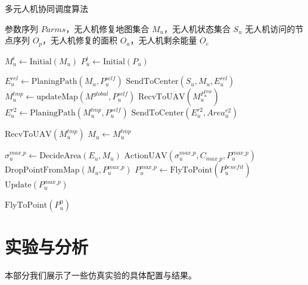 \documentclass[AutoFakeBold]{LZUThesis}
\begin{document}
\begin{algorithm}[H]
	\caption{多元人机协同调度算法}
	\label{alg:multi_uav_scheduling}
	\begin{algorithmic}[1]
		\Require 参数序列 $Parms$，无人机修复地图集合 $M_u$，无人机状态集合 $S_u$
		\Ensure 无人机访问的节点序列 $O_p$，无人机修复的面积 $O_a$，无人机剩余能量 $O_e$

		\State $M_u^i \gets \text{Initial}(M_u)$ 
		\State $P_u^i \gets \text{Initial}(P_u)$ 

		\State $E_u^{rel} \gets \text{PlaningPath}(M_u, P_u^{self})$ 
		\State $\text{SendToCenter}(S_u, M_u, E_u^{rel})$ 
		\State $M_u^{tmp} \gets \text{updateMap}(M^{global}, P_u^{self})$ 
		\State $\text{RecvToUAV}(M_u^{P_u^{tmp}})$ 
		\State $E_u^{r2} \gets \text{PlaningPath}(M_u^{tmp}, P_u^{self})$ 
		\State $\text{SendToCenter}(E_u^{r2}, Area_u^{r2})$ 

		\State $\text{RecvToUAV}(M_u^{tmp})$ 
		\State $M_u \gets M_u^{tmp}$
		\EndIf

		\State $\sigma_u^{max\_p} \gets \text{DecideArea}(E_u, M_u)$ 
		\State $\text{ActionUAV}(\sigma_u^{max\_p}, C_{max\_p}, P_u^{max\_p})$ 
		\State $\text{DropPointFromMap}(M_u, P_u^{max\_p})$
		\State $P_u^{max\_p} \gets \text{FlyToPoint}(P_u^{benefit})$ 
		\State $\text{Update}(P_u^{max\_p})$ 
		\EndWhile

		\State $\text{FlyToPoint}(P_u^0)$ 
	\end{algorithmic}
\end{algorithm}


\chapter{实验与分析}
本部分我们展示了一些仿真实验的具体配置与结果。
\label{sub:实验配置表格}
\end{document}

